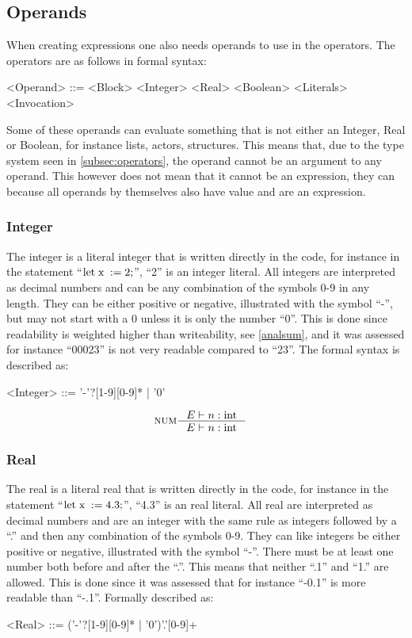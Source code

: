 \subsection{Operands}\label{operands}

When creating expressions one also needs operands to use in the operators. The operators are as follows in formal syntax:
\begin{grammar}
<Operand>	::= <Block>
 \alt <Integer>
 \alt <Real>
 \alt <Boolean>
 \alt <Literals>
 \alt <Invocation>
\end{grammar}
Some of these operands can evaluate something that is not either an Integer, Real or Boolean, for instance lists, actors, structures. This means that, due to the type system seen in \cref{subsec:operators}, the operand cannot be an argument to any operand. This however does not mean that it cannot be an expression, they can because all operands by themselves also have value and are an expression.

\subsubsection{Integer}
The integer is a literal integer that is written directly in the code, for instance in the statement \enquote{$\text{let} \mathbin{\; \text{x} \;} := 2;$}, \enquote{2} is an integer literal. All integers are interpreted as decimal numbers and can be any combination of the symbols 0-9 in any length. They can be either positive or negative, illustrated with the symbol \enquote{-}, but may not start with a 0 unless it is only the number \enquote{0}. This is done since readability is weighted higher than writeability, see \cref{analsum}, and it was assessed for instance \enquote{00023} is not very readable compared to \enquote{23}. The formal syntax is described as:
\begin{grammar}
<Integer> ::= '-'?[1-9][0-9]* | '0'
\end{grammar}

\begin{align*}
&\inference[NUM]{\Tenv n:\Tint}
                 {\Tenv n: \Tint} 
\end{align*}

\subsubsection{Real}
The real is a literal real that is written directly in the code, for instance in the statement \enquote{$\text{let} \mathbin{\; \text{x} \;} := 4.3;$}, \enquote{4.3} is an real literal. All real are interpreted as decimal numbers and are an integer with the same rule as integers followed by a \enquote{.} and then any combination of the symbols 0-9. They can like integers be either positive or negative, illustrated with the symbol \enquote{-}. There must be at least one number both before and after the \enquote{.}. This means that neither \enquote{.1} and \enquote{1.} are allowed. This is done since it was assessed that for instance \enquote{-0.1} is more readable than \enquote{-.1}. Formally described as:
\begin{grammar}
<Real> ::= ('-'?[1-9][0-9]* | '0')'.'[0-9]+
\end{grammar}

